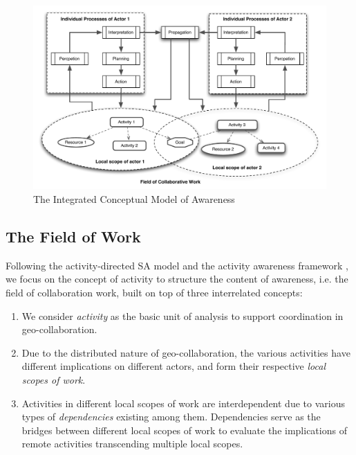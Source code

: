 \begin{figure}[htbp] %
   \centering
   \includegraphics[width=5.5in]{conceptual_framework.pdf} 
   \caption{The Integrated Conceptual Model of Awareness}
   \label{fig:conceptual_framework}
\end{figure}

\subsection{The Field of Work} %
\label{sub:the_field_of_work}
Following the activity-directed SA model \cite{Bedny1999} and the activity awareness framework \cite{carroll2003a}, we focus on the concept of activity to structure the content of awareness, i.e. the field of collaboration work, built on top of three interrelated concepts:

\begin{enumerate}
	\item We consider \emph{activity} as the basic unit of analysis to support coordination in geo-collaboration.
	\item Due to the distributed nature of geo-collaboration, the various activities have different implications on different actors, and form their respective \emph{local scopes of work}.
	\item Activities in different local scopes of work are interdependent due to various types of \emph{dependencies} existing among them. Dependencies serve as the bridges between different local scopes of work to evaluate the implications of remote activities transcending multiple local scopes. 
	
\end{enumerate}

